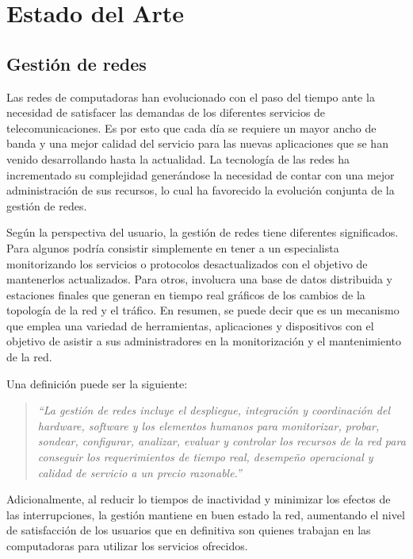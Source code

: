 \chapter{Estado del Arte}
\label{chap:basis}

\section{Gestión de redes}
\label{sec:network_management}
 Las redes de computadoras han evolucionado con el paso del tiempo ante la
necesidad de satisfacer las demandas de los diferentes servicios de
telecomunicaciones. Es por esto que cada día se requiere un mayor ancho de banda
y una mejor calidad del servicio para las nuevas aplicaciones que se han venido
desarrollando hasta la actualidad. La tecnología de las redes ha incrementado su
complejidad generándose la necesidad de contar con una mejor administración de
sus recursos, lo cual ha favorecido la evolución conjunta de la gestión de
redes. 

Según la perspectiva del usuario, la gestión de redes tiene diferentes
significados. Para algunos podría consistir simplemente en tener a un
especialista monitorizando los servicios o protocolos desactualizados con el
objetivo de mantenerlos actualizados. Para otros, involucra una base de datos
distribuida y estaciones finales que generan en tiempo real gráficos de los
cambios de la topología de la red y el tráfico. En resumen, se puede decir que
es un mecanismo que emplea una variedad de herramientas, aplicaciones y
dispositivos con el objetivo de asistir a sus administradores en la
monitorización y el mantenimiento de la red.

Una definición puede ser la siguiente\cite{Saydam1996}:
\begin{quotation}
 \emph{``La gestión de redes incluye el despliegue, integración y coordinación
del hardware, software y los elementos humanos para monitorizar, probar,
sondear, configurar, analizar, evaluar y controlar los recursos de la red para
conseguir los requerimientos de tiempo real, desempeño operacional y calidad de
servicio a un precio razonable.''}
\end{quotation}

Adicionalmente, al reducir lo tiempos de inactividad y minimizar los efectos de
las interrupciones, la gestión mantiene en buen estado la red, aumentando el
nivel de satisfacción de los usuarios que en definitiva son quienes trabajan en
las computadoras para utilizar los servicios ofrecidos.

